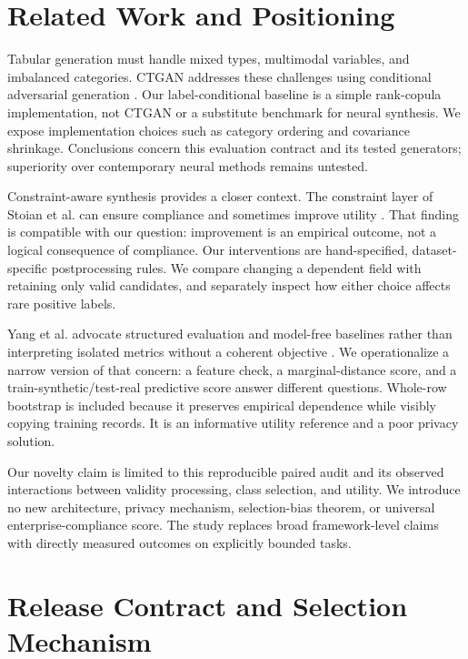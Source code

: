 \documentclass{svproc}
\begin{document}
\section{Related Work and Positioning}
Tabular generation must handle mixed types, multimodal variables, and imbalanced categories. CTGAN addresses these challenges using conditional adversarial generation \cite{xu2019}. Our label-conditional baseline is a simple rank-copula implementation, not CTGAN or a substitute benchmark for neural synthesis. We expose implementation choices such as category ordering and covariance shrinkage. Conclusions concern this evaluation contract and its tested generators; superiority over contemporary neural methods remains untested.

Constraint-aware synthesis provides a closer context. The constraint layer of Stoian et al. can ensure compliance and sometimes improve utility \cite{stoian2024}. That finding is compatible with our question: improvement is an empirical outcome, not a logical consequence of compliance. Our interventions are hand-specified, dataset-specific postprocessing rules. We compare changing a dependent field with retaining only valid candidates, and separately inspect how either choice affects rare positive labels.

Yang et al. advocate structured evaluation and model-free baselines rather than interpreting isolated metrics without a coherent objective \cite{yang2024}. We operationalize a narrow version of that concern: a feature check, a marginal-distance score, and a train-synthetic/test-real predictive score answer different questions. Whole-row bootstrap is included because it preserves empirical dependence while visibly copying training records. It is an informative utility reference and a poor privacy solution.

Our novelty claim is limited to this reproducible paired audit and its observed interactions between validity processing, class selection, and utility. We introduce no new architecture, privacy mechanism, selection-bias theorem, or universal enterprise-compliance score. The study replaces broad framework-level claims with directly measured outcomes on explicitly bounded tasks.

\section{Release Contract and Selection Mechanism}
\end{document}
